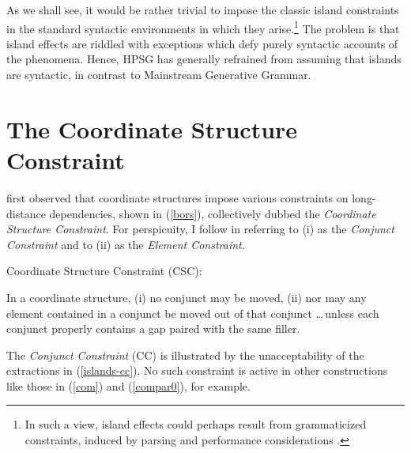 \documentclass[output=paper
 	        ,biblatex
                ,babelshorthands
                ,newtxmath
                ,draftmode
                ,colorlinks, citecolor=brown
]{langscibook}
\begin{document}
\noindent
As we shall see, it would be rather trivial to impose the classic island constraints in the standard syntactic
environments in which they arise.\footnote{In such a view, island effects could perhaps result from
grammaticized constraints, induced by parsing and performance considerations  
\citep{prichett,fodor78,Fodor83}.}
 The problem is that island effects are riddled with exceptions which
defy purely syntactic accounts of the phenomena.  Hence, HPSG has generally refrained from
assuming that islands are syntactic, in contrast to Mainstream Generative Grammar.


\section{The Coordinate Structure Constraint}

\citet{Ross67} first observed that coordinate structures impose various constraints on long-distance
dependencies, shown in (\ref{bors}), collectively dubbed the \emph{Coordinate Structure
  Constraint}. For perspicuity, I follow \citet{grosu73} in referring to (i) as the \emph{Conjunct
  Constraint} and to (ii) as the \emph{Element Constraint}.

\eanoraggedright \label{bors}
Coordinate Structure Constraint (CSC):

In a coordinate structure, (i) no conjunct may be moved, (ii) nor may any element contained in a
conjunct be moved out of that conjunct \ldots \,unless each conjunct properly contains a gap paired
with the same filler.  \z

\largerpage
\noindent
The \emph{Conjunct Constraint} (CC) is illustrated by the unacceptability of the extractions in
(\ref{islands-cc}). No such constraint is active in other constructions like those in (\ref{com})
and (\ref{compar0}), for example.
 

\eal
\label{islands-cc}  
\zl 

\eal
\label{com}
\zl
\end{document}
